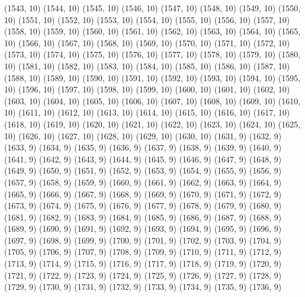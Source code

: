 {   (1543, 10)
   (1544, 10)
   (1545, 10)
   (1546, 10)
   (1547, 10)
   (1548, 10)
   (1549, 10)
   (1550, 10)
   (1551, 10)
   (1552, 10)
   (1553, 10)
   (1554, 10)
   (1555, 10)
   (1556, 10)
   (1557, 10)
   (1558, 10)
   (1559, 10)
   (1560, 10)
   (1561, 10)
   (1562, 10)
   (1563, 10)
   (1564, 10)
   (1565, 10)
   (1566, 10)
   (1567, 10)
   (1568, 10)
   (1569, 10)
   (1570, 10)
   (1571, 10)
   (1572, 10)
   (1573, 10)
   (1574, 10)
   (1575, 10)
   (1576, 10)
   (1577, 10)
   (1578, 10)
   (1579, 10)
   (1580, 10)
   (1581, 10)
   (1582, 10)
   (1583, 10)
   (1584, 10)
   (1585, 10)
   (1586, 10)
   (1587, 10)
   (1588, 10)
   (1589, 10)
   (1590, 10)
   (1591, 10)
   (1592, 10)
   (1593, 10)
   (1594, 10)
   (1595, 10)
   (1596, 10)
   (1597, 10)
   (1598, 10)
   (1599, 10)
   (1600, 10)
   (1601, 10)
   (1602, 10)
   (1603, 10)
   (1604, 10)
   (1605, 10)
   (1606, 10)
   (1607, 10)
   (1608, 10)
   (1609, 10)
   (1610, 10)
   (1611, 10)
   (1612, 10)
   (1613, 10)
   (1614, 10)
   (1615, 10)
   (1616, 10)
   (1617, 10)
   (1618, 10)
   (1619, 10)
   (1620, 10)
   (1621, 10)
   (1622, 10)
   (1623, 10)
   (1624, 10)
   (1625, 10)
   (1626, 10)
   (1627, 10)
   (1628, 10)
   (1629, 10)
   (1630, 10)
   (1631, 9)
   (1632, 9)
   (1633, 9)
   (1634, 9)
   (1635, 9)
   (1636, 9)
   (1637, 9)
   (1638, 9)
   (1639, 9)
   (1640, 9)
   (1641, 9)
   (1642, 9)
   (1643, 9)
   (1644, 9)
   (1645, 9)
   (1646, 9)
   (1647, 9)
   (1648, 9)
   (1649, 9)
   (1650, 9)
   (1651, 9)
   (1652, 9)
   (1653, 9)
   (1654, 9)
   (1655, 9)
   (1656, 9)
   (1657, 9)
   (1658, 9)
   (1659, 9)
   (1660, 9)
   (1661, 9)
   (1662, 9)
   (1663, 9)
   (1664, 9)
   (1665, 9)
   (1666, 9)
   (1667, 9)
   (1668, 9)
   (1669, 9)
   (1670, 9)
   (1671, 9)
   (1672, 9)
   (1673, 9)
   (1674, 9)
   (1675, 9)
   (1676, 9)
   (1677, 9)
   (1678, 9)
   (1679, 9)
   (1680, 9)
   (1681, 9)
   (1682, 9)
   (1683, 9)
   (1684, 9)
   (1685, 9)
   (1686, 9)
   (1687, 9)
   (1688, 9)
   (1689, 9)
   (1690, 9)
   (1691, 9)
   (1692, 9)
   (1693, 9)
   (1694, 9)
   (1695, 9)
   (1696, 9)
   (1697, 9)
   (1698, 9)
   (1699, 9)
   (1700, 9)
   (1701, 9)
   (1702, 9)
   (1703, 9)
   (1704, 9)
   (1705, 9)
   (1706, 9)
   (1707, 9)
   (1708, 9)
   (1709, 9)
   (1710, 9)
   (1711, 9)
   (1712, 9)
   (1713, 9)
   (1714, 9)
   (1715, 9)
   (1716, 9)
   (1717, 9)
   (1718, 9)
   (1719, 9)
   (1720, 9)
   (1721, 9)
   (1722, 9)
   (1723, 9)
   (1724, 9)
   (1725, 9)
   (1726, 9)
   (1727, 9)
   (1728, 9)
   (1729, 9)
   (1730, 9)
   (1731, 9)
   (1732, 9)
   (1733, 9)
   (1734, 9)
   (1735, 9)
   (1736, 9)
}

